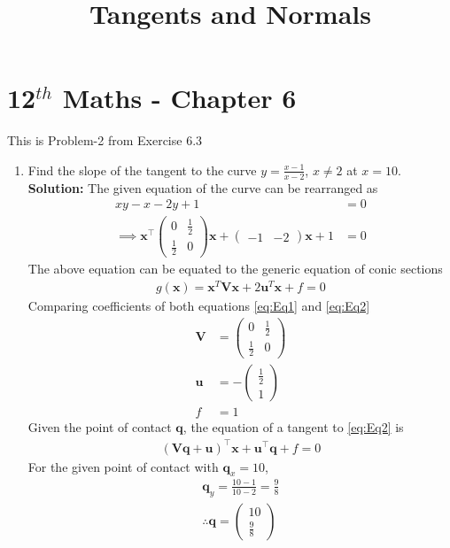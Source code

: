 \documentclass[12pt]{article}
\providecommand{\brak}[1]{\ensuremath{\left(#1\right)}}
\newcommand{\solution}{\noindent \textbf{Solution: }}
\newcommand{\myvec}[1]{\ensuremath{\begin{pmatrix}#1\end{pmatrix}}}
\let\vec\mathbf
\begin{document}
\begin{center}
\title{\textbf{Tangents and Normals}}
\date{\vspace{-5ex}} %
\maketitle
\end{center}
\setcounter{page}{1}

\section{12$^{th}$ Maths - Chapter 6}
This is Problem-2 from Exercise 6.3 
\begin{enumerate}
\item Find the slope of the tangent to the curve $y = \frac{x-1}{x-2}$, $x \neq 2$ at $x=10$.
\solution 
The given equation of the curve can be rearranged as
\begin{align}
	xy-x-2y+1 &= 0 \\
        \label{eq:Eq1}
	\implies \vec{x}^\top\myvec{0 & \frac{1}{2} \\ \frac{1}{2} & 0}\vec{x} + \myvec{-1 & -2}\vec{x}+1 &= 0 
\end{align}
The above equation can be equated to the generic equation of conic sections
\begin{align}
	\label{eq:Eq2}
	g\brak{\vec{x}} = \vec{x}^T\vec{V}\vec{x} + 2\vec{u}^T\vec{x} + f = 0 
\end{align}
Comparing coefficients of both equations \eqref{eq:Eq1} and \eqref{eq:Eq2} 
\begin{align}
	\vec{V} &= \myvec{ 0 & \frac{1}{2} \\ \frac{1}{2} & 0} \\
	\vec{u} &= -\myvec{\frac{1}{2} \\ 1} \\
	f &= 1 
\end{align}
Given the point of contact $\vec{q}$, the equation of a tangent to \eqref{eq:Eq2} is
\begin{align}
	\label{eq:Eq3}
	\brak{\vec{V}\vec{q} + \vec{u}}^\top \vec{x} + \vec{u}^\top\vec{q} + f = 0
\end{align}
		For the given point of contact with $\vec{q}_x=10$,
\begin{align}
	\vec{q}_y = \frac{10-1}{10-2} = \frac{9}{8} \\
	 \therefore \vec{q} = \myvec{10 \\ \frac{9}{8}}
\end{align}

\end{enumerate}
\end{document}
